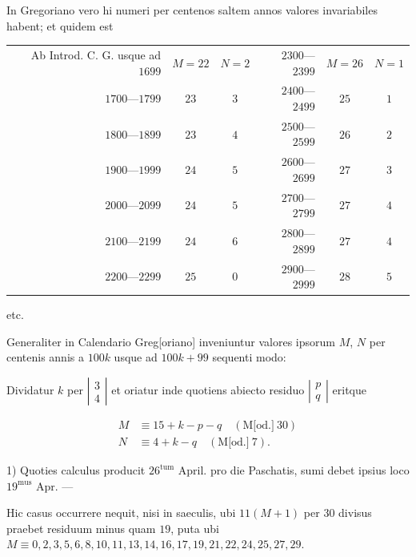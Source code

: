\clearpage{}
In Gregoriano vero hi numeri per centenos saltem annos valores invariabiles habent; et quidem est
\begin{center}\small
\setlength{\tabcolsep}{3pt}\renewcommand{\arraystretch}{1.25}
\begin{tabular}{rcc|rcc}
Ab Introd. C. G. usque ad $1699$ & $M=22$ & $N=2$ & $2300$---$2399$ & $M=26$ & $N=1$\\
$1700$---$1799$ & $23$ & $3$ & $2400$---$2499$ & $25$ & $1$\\
$1800$---$1899$ & $23$ & $4$ & $2500$---$2599$ & $26$ & $2$\\
$1900$---$1999$ & $24$ & $5$ & $2600$---$2699$ & $27$ & $3$\\
$2000$---$2099$ & $24$ & $5$ & $2700$---$2799$ & $27$ & $4$\\
$2100$---$2199$ & $24$ & $6$ & $2800$---$2899$ & $27$ & $4$\\
$2200$---$2299$ & $25$ & $0$ & $2900$---$2999$ & $28$ & $5$
\end{tabular}\par
etc.
\end{center}
\noindent Generaliter in Calendario Greg[oriano] inveniuntur valores ipsorum $M$, $N$ per centenis annis a $100k$ usque ad $100k+99$ sequenti modo:
\begin{center}
Dividatur $k$ per $\left|\begin{smallmatrix}3\\4\end{smallmatrix}\right|$ et oriatur inde quotiens abiecto residuo $\left|\begin{smallmatrix}p\\q\end{smallmatrix}\right|$ eritque
\end{center}
\[
\begin{aligned}
M&\equiv15+k-p-q\quad(\text{M[od.]}\ 30)\\
N&\equiv4+k-q\quad(\text{M[od.]}\ 7).
\end{aligned}
\]


1) Quoties calculus producit $26^{\mathrm{tum}}$ April. pro die Paschatis, sumi debet ipsius loco $19^{\mathrm{mus}}$ Apr. ---

Hic casus occurrere nequit, nisi in saeculis, ubi $11(M+1)$ per $30$ divisus praebet residuum minus quam $19$, puta ubi $M\equiv0,\allowbreak 2,\allowbreak 3,\allowbreak 5,\allowbreak 6,\allowbreak 8,\allowbreak 10,\allowbreak 11,\allowbreak 13,\allowbreak 14,\allowbreak 16,\allowbreak 17,\allowbreak 19,\allowbreak 21,\allowbreak 22,\allowbreak 24,\allowbreak 25,\allowbreak 27,\allowbreak 29$.

